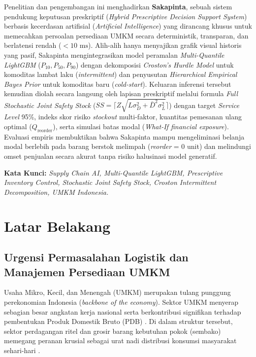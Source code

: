 \documentclass[12pt,a4paper]{article}
\begin{document}
Penelitian dan pengembangan ini menghadirkan \textbf{Sakapinta}, sebuah sistem pendukung keputusan preskriptif (\textit{Hybrid Prescriptive Decision Support System}) berbasis kecerdasan artifisial (\textit{Artificial Intelligence}) yang dirancang khusus untuk memecahkan persoalan persediaan UMKM secara deterministik, transparan, dan berlatensi rendah ($<10\text{ ms}$). Alih-alih hanya menyajikan grafik visual historis yang pasif, Sakapinta mengintegrasikan model peramalan \textit{Multi-Quantile LightGBM} ($P_{10}, P_{50}, P_{90}$) dengan dekomposisi \textit{Croston's Hurdle Model} untuk komoditas lambat laku (\textit{intermittent}) dan penyusutan \textit{Hierarchical Empirical Bayes Prior} untuk komoditas baru (\textit{cold-start}). Keluaran inferensi tersebut kemudian diolah secara langsung oleh lapisan preskriptif melalui formula \textit{Full Stochastic Joint Safety Stock} ($SS = \lceil Z \sqrt{L \sigma_D^2 + \bar{D}^2 \sigma_L^2} \rceil$) dengan target \textit{Service Level} 95\%, indeks skor risiko \textit{stockout} multi-faktor, kuantitas pemesanan ulang optimal ($Q_{\text{reorder}}$), serta simulasi batas modal (\textit{What-If financial exposure}). Evaluasi empiris membuktikan bahwa Sakapinta mampu mengeliminasi belanja modal berlebih pada barang berstok melimpah (\textit{reorder} = 0 unit) dan melindungi omset penjualan secara akurat tanpa risiko halusinasi model generatif.

\vspace{0.4cm}
\noindent \textbf{Kata Kunci:} \textit{Supply Chain AI, Multi-Quantile LightGBM, Prescriptive Inventory Control, Stochastic Joint Safety Stock, Croston Intermittent Decomposition, UMKM Indonesia.}

\newpage
\tableofcontents
\newpage

\setcounter{page}{1}

\section{Latar Belakang}

\subsection{Urgensi Permasalahan Logistik dan Manajemen Persediaan UMKM}
Usaha Mikro, Kecil, dan Menengah (UMKM) merupakan tulang punggung perekonomian Indonesia (\textit{backbone of the economy}). Sektor UMKM menyerap sebagian besar angkatan kerja nasional serta berkontribusi signifikan terhadap pembentukan Produk Domestik Bruto (PDB) \citep{bps2023profil}. Di dalam struktur tersebut, sektor perdagangan ritel dan grosir barang kebutuhan pokok (sembako) memegang peranan krusial sebagai urat nadi distribusi konsumsi masyarakat sehari-hari \citep{bi2023laporan}.
\end{document}
